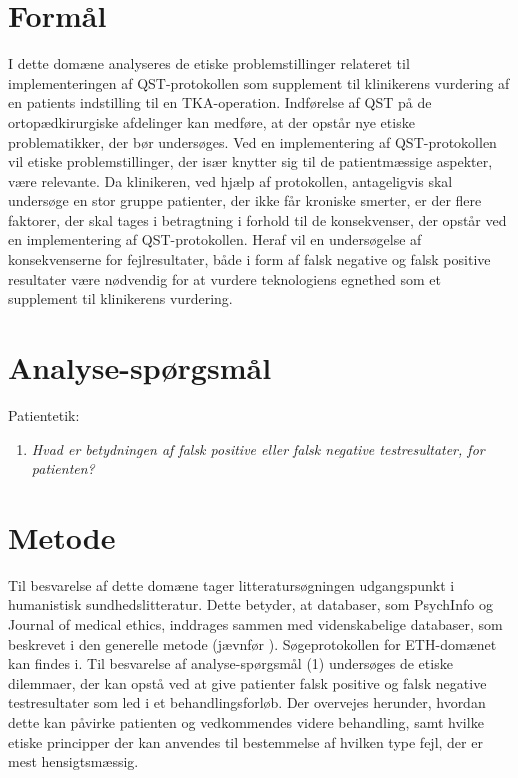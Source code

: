 \section{Formål}
I dette domæne analyseres de etiske problemstillinger relateret til implementeringen af QST-protokollen som supplement til klinikerens vurdering af en patients indstilling til en TKA-operation. Indførelse af QST på de ortopædkirurgiske afdelinger kan medføre, at der opstår nye etiske problematikker, der bør undersøges. Ved en implementering af QST-protokollen vil etiske problemstillinger, der især knytter sig til de patientmæssige aspekter, være relevante. Da klinikeren, ved hjælp af protokollen, antageligvis skal undersøge en stor gruppe patienter, der ikke får kroniske smerter, er der flere faktorer, der skal tages i betragtning i forhold til de konsekvenser, der opstår ved en implementering af QST-protokollen. Heraf vil en undersøgelse af konsekvenserne for fejlresultater, både i form af falsk negative og falsk positive resultater være nødvendig for at vurdere teknologiens egnethed som et supplement til klinikerens vurdering.

\section{Analyse-spørgsmål}
Patientetik:
\begin{enumerate}
\item \textit{Hvad er betydningen af falsk positive eller falsk negative testresultater, for patienten?} %
\end{enumerate}

\section{Metode}
Til besvarelse af dette domæne tager litteratursøgningen udgangspunkt i humanistisk sundhedslitteratur. Dette betyder, at databaser, som PsychInfo og Journal of medical ethics, inddrages sammen med videnskabelige databaser, som beskrevet i den generelle metode (jævnfør ). Søgeprotokollen for ETH-domænet kan findes i.
Til besvarelse af analyse-spørgsmål (1) undersøges de etiske dilemmaer, der kan opstå ved at give patienter falsk positive og falsk negative testresultater som led i et behandlingsforløb. Der overvejes herunder, hvordan dette kan påvirke patienten og vedkommendes videre behandling, samt hvilke etiske principper der kan anvendes til bestemmelse af hvilken type fejl, der er mest hensigtsmæssig.

